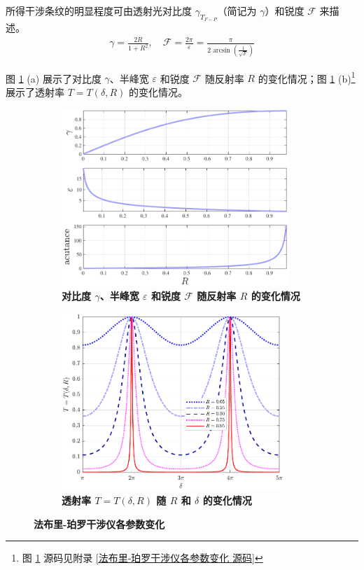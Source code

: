 \documentclass[UTF8]{report}
\theoremstyle{MyLineTheoremStyle} %
\theoremstyle{MyBlockTheoremStyle} %
\theoremstyle{MySubsubsectionStyle} %
\begin{document}
所得干涉条纹的明显程度可由透射光对比度 $\gamma_{T_{F-P}}$（简记为 $\gamma$）和锐度 $\mathscr{F}$ 来描述。
\begin{gather}
\gamma = \frac{2R}{1 + R^2}
,\quad 
\mathscr{F} = \frac{2\pi}{\varepsilon} = \frac{\pi}{2 \arcsin \left(\frac{1}{\sqrt{F}}\right)}
\end{gather}

图 \ref{法布里-珀罗干涉仪各参数变化} (a) 展示了对比度 $\gamma$、半峰宽 $\varepsilon$ 和锐度 $\mathscr{F}$ 随反射率 $R$ 的变化情况；图 \ref{法布里-珀罗干涉仪各参数变化} (b)\footnote{图 \ref{法布里-珀罗干涉仪各参数变化} 源码见附录 \ref{法布里-珀罗干涉仪各参数变化 源码}} 展示了透射率 $T = T(\delta, R)$ 的变化情况。

\begin{figure}[H]\centering
\begin{subfigure}[t]{0.49\columnwidth}\centering
    \includegraphics[height=190pt]{assets/3/对比度、半峰宽和锐度随反射率 R 的变化情况.pdf}
    \caption{\bfseries 对比度 $\gamma$、半峰宽 $\varepsilon$ 和锐度 $\mathscr{F}$ 随反射率 $R$ 的变化情况 }
\end{subfigure}\hfill
\begin{subfigure}[t]{0.49\columnwidth}\centering
    \includegraphics[height=190pt]{assets/3/透射率 T 随 R 和 delta 的变化.pdf}
    \caption{\bfseries 透射率 $T = T(\delta, R)$ 随 $R$ 和 $\delta$ 的变化情况 }
\end{subfigure}
\caption{\bfseries 法布里-珀罗干涉仪各参数变化 }\label{法布里-珀罗干涉仪各参数变化}
\end{figure}
\end{document}
